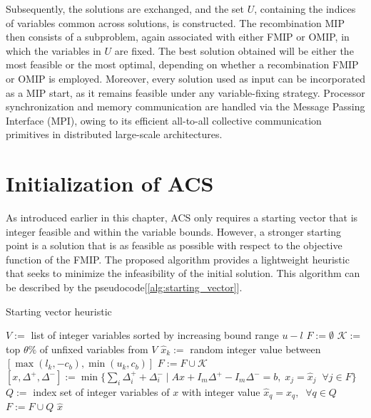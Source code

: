 Subsequently, the solutions are exchanged, and the set $U$, containing the indices of variables common across solutions, is constructed. The recombination MIP then consists of a subproblem, again associated with either FMIP or OMIP, in which the variables in $U$ are fixed.
The best solution obtained will be either the most feasible or the most optimal, depending on whether a recombination FMIP or OMIP is employed. Moreover, every solution used as input can be incorporated as a MIP start, as it remains feasible under any variable-fixing strategy.
Processor synchronization and memory communication are handled via the Message Passing Interface (MPI), owing to its efficient all-to-all collective communication primitives in distributed large-scale architectures.

\section{Initialization of ACS}
As introduced earlier in this chapter, ACS only requires a starting vector that is integer feasible and within the variable bounds. However, a stronger starting point is a solution that is as feasible as possible with respect to the objective function of the FMIP.
The proposed algorithm provides a lightweight heuristic that seeks to minimize the infeasibility of the initial solution. This algorithm can be described by the pseudocode[\ref{alg:starting_vector}].
\begin{algorithm}
\caption{Starting vector heuristic}\label{alg:starting_vector}
\begin{algorithmic}[1]
\State $V :=$ list of integer variables sorted by increasing bound range $u-l$
\State $F := \emptyset$
    \State $\mathcal{K} :=$ top $\theta \%$ of unfixed variables from $V$
        \State $\hat{x}_k :=$ random integer value between $[\max(l_k, -c_b), \min(u_k, c_b)]$
    \EndFor
    \State $F := F \cup \mathcal{K}$
    \State $[x, \Delta^+, \Delta^-] := \min\{\sum_i \Delta_i^+ + \Delta_i^- \mid A x + I_m \Delta^+ - I_m \Delta^- = b, \; x_j = \hat{x}_j \;\; \forall j \in F\}$
    \State $Q :=$ index set of integer variables of $x$ with integer value
    \State $\hat{x}_q = x_q, \;\; \forall q \in Q$
    \State $F := F \cup Q$
\EndWhile
\State \Return $\hat{x}$
\end{algorithmic}
\end{algorithm}
